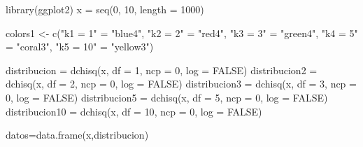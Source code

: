 \documentclass[
]{article}
\newenvironment{Shaded}{\begin{snugshade}}{\end{snugshade}}
\newcommand{\AttributeTok}[1]{\textcolor[rgb]{0.77,0.63,0.00}{#1}}
\newcommand{\ConstantTok}[1]{\textcolor[rgb]{0.00,0.00,0.00}{#1}}
\newcommand{\DecValTok}[1]{\textcolor[rgb]{0.00,0.00,0.81}{#1}}
\newcommand{\FunctionTok}[1]{\textcolor[rgb]{0.00,0.00,0.00}{#1}}
\newcommand{\NormalTok}[1]{#1}
\newcommand{\OtherTok}[1]{\textcolor[rgb]{0.56,0.35,0.01}{#1}}
\newcommand{\StringTok}[1]{\textcolor[rgb]{0.31,0.60,0.02}{#1}}
\begin{document}
\begin{Shaded}
\begin{Highlighting}[]
\FunctionTok{library}\NormalTok{(ggplot2)}
\NormalTok{x }\OtherTok{=} \FunctionTok{seq}\NormalTok{(}\DecValTok{0}\NormalTok{, }\DecValTok{10}\NormalTok{, }\AttributeTok{length =} \DecValTok{1000}\NormalTok{)}


\NormalTok{colors1 }\OtherTok{\textless{}{-}} \FunctionTok{c}\NormalTok{(}\StringTok{"k1 = 1"} \OtherTok{=} \StringTok{"blue4"}\NormalTok{, }\StringTok{"k2 = 2"} \OtherTok{=} \StringTok{"red4"}\NormalTok{, }\StringTok{"k3 = 3"} \OtherTok{=} \StringTok{"green4"}\NormalTok{, }\StringTok{"k4 = 5"} \OtherTok{=} \StringTok{"coral3"}\NormalTok{, }\StringTok{"k5 = 10"} \OtherTok{=} \StringTok{"yellow3"}\NormalTok{)}

\NormalTok{distribucion }\OtherTok{=} \FunctionTok{dchisq}\NormalTok{(x, }\AttributeTok{df =} \DecValTok{1}\NormalTok{, }\AttributeTok{ncp =} \DecValTok{0}\NormalTok{, }\AttributeTok{log =} \ConstantTok{FALSE}\NormalTok{)}
\NormalTok{distribucion2 }\OtherTok{=} \FunctionTok{dchisq}\NormalTok{(x, }\AttributeTok{df =} \DecValTok{2}\NormalTok{, }\AttributeTok{ncp =} \DecValTok{0}\NormalTok{, }\AttributeTok{log =} \ConstantTok{FALSE}\NormalTok{)}
\NormalTok{distribucion3 }\OtherTok{=} \FunctionTok{dchisq}\NormalTok{(x, }\AttributeTok{df =} \DecValTok{3}\NormalTok{, }\AttributeTok{ncp =} \DecValTok{0}\NormalTok{, }\AttributeTok{log =} \ConstantTok{FALSE}\NormalTok{)}
\NormalTok{distribucion5 }\OtherTok{=} \FunctionTok{dchisq}\NormalTok{(x, }\AttributeTok{df =} \DecValTok{5}\NormalTok{, }\AttributeTok{ncp =} \DecValTok{0}\NormalTok{, }\AttributeTok{log =} \ConstantTok{FALSE}\NormalTok{)}
\NormalTok{distribucion10 }\OtherTok{=} \FunctionTok{dchisq}\NormalTok{(x, }\AttributeTok{df =} \DecValTok{10}\NormalTok{, }\AttributeTok{ncp =} \DecValTok{0}\NormalTok{, }\AttributeTok{log =} \ConstantTok{FALSE}\NormalTok{)}

\NormalTok{datos}\OtherTok{=}\FunctionTok{data.frame}\NormalTok{(x,distribucion)}


\end{Highlighting}
\end{Shaded}
\end{document}
